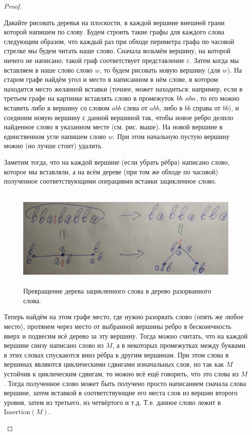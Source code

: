 \documentclass[12pt,a4paper]{article}
\newcommand{\Insertion}{\mathrm{Insertion}}
\begin{document}
\begin{problem}{8}
\begin{enumerate}
\begin{proof}
\begin{enumerate}
                            Давайте рисовать деревья на плоскости, в каждой вершине внешней грани которой напишем по слову. Будем строить такие графы для каждого слова следующим образом, что каждый раз при обходе периметра графа по часовой стрелке мы будем читать наше слово. Сначала возьмём вершину, на которой ничего не написано; такой граф соответствует представление $\varepsilon$. Затем когда мы вставляем в наше слово слово $w$, то будем рисовать новую вершину (для $w$). На старом графе найдём угол и место в написанном в нём слове, в котором находится место желанной вставки (точнее, может находиться: например, если в третьем графе на картинке вставлять слово в промежуток $bb \text{\textvisiblespace} aba$, то его можно вставить либо в вершину со словом $abb$ слева от $abb$, либо в $bb$ справа от $bb$), и соединим новую вершину с данной вершиной так, чтобы новое ребро делило найденное слово в указанном месте (см. рис. выше). На новой вершине в единственном угле напишем слово $w$. При этом начальную пустую вершину можно (но лучше стоит) удалить.

                            Заметим тогда, что на каждой вершине (если убрать рёбра) написано слово, которое мы вставляли, а на всём дереве (при том же обходе по часовой) полученное соответствующими операциями вставки зацикленное слово.
                            
                            \begin{figure}[H]
                                \centering
                                \includegraphics[height=5cm]{TI-HW-006-7.jpg}
                                \caption{Превращение дерева зацикленного слова в дерево разорванного слова.}
                            \end{figure}
                            
                            Теперь найдём на этом графе место, где нужно разорвать слово (опять же любое место), протянем через место от выбранной вершины ребро в бесконечность вверх и подвесим всё дерево за эту вершину. Тогда можно считать, что на каждой вершине снизу написано слово из $M$, а в некоторых промежутках между буквами в этих словах спускаются вниз рёбра к другим вершинам. При этом слова в вершинах являются циклическими сдвигами изначальных слов, но так как $M$ устойчив к циклическим сдвигам, то можно всё ещё говорить, что это слова из $M$. Тогда полученное слово может быть получено просто написанием сначала слова вершине, затем вставкой в соответствующие его места слов из вершин второго уровня, затем из третьего, из четвёртого и т.д. Т.е. данное слово лежит в $\Insertion(M)$.
                            

\end{enumerate}
\end{proof}
\end{enumerate}
\end{problem}
\end{document}
